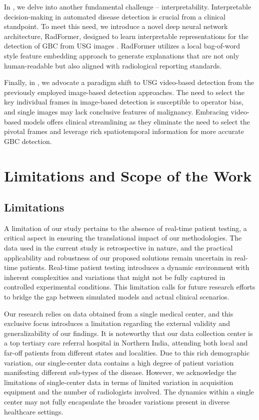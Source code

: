 \par In , we delve into another fundamental challenge -- interpretability. Interpretable decision-making in automated disease detection is crucial from a clinical standpoint. To meet this need, we introduce a novel deep neural network architecture, RadFormer, designed to learn interpretable representations for the detection of  GBC from USG images \cite{basu2023radformer}. RadFormer utilizes a local bag-of-word style feature embedding approach to generate explanations that are not only human-readable but also aligned with radiological reporting standards.

\par Finally, in , we advocate a paradigm shift to USG video-based detection from the previously employed image-based detection approaches. The need to select the key individual frames in image-based detection is susceptible to operator bias, and single images may lack conclusive features of malignancy. Embracing video-based models offers clinical streamlining as they eliminate the need to select the pivotal frames and leverage rich spatiotemporal information for more accurate GBC detection.

\section{Limitations and Scope of the Work}
%
\subsection{Limitations}
%
A limitation of our study pertains to the absence of real-time patient testing, a critical aspect in ensuring the translational impact of our methodologies. The data used in the current study is retrospective in nature, and the practical applicability and robustness of our proposed solutions remain uncertain in real-time patients. Real-time patient testing introduces a dynamic environment with inherent complexities and variations that might not be fully captured in controlled experimental conditions. This limitation calls for future research efforts to bridge the gap between simulated models and actual clinical scenarios. %

%
Our research relies on data obtained from a single medical center, and this exclusive focus introduces a limitation regarding the external validity and generalizability of our findings. It is noteworthy that our data collection center is a top tertiary care referral hospital in Northern India, attending both local and far-off patients from different states and localities. Due to this rich demographic variation, our single-center data contains a high degree of patient variation manifesting different sub-types of the disease. However, we acknowledge the limitations of single-center data in terms of limited variation in acquisition equipment and the number of radiologists involved. The dynamics within a single center may not fully encapsulate the broader variations present in diverse healthcare settings. 

